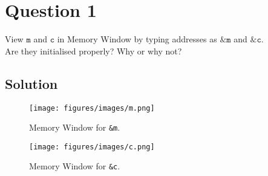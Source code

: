 \section*{Question 1}

View \(\texttt{m}\) and \(\texttt{c}\) in Memory Window by typing addresses as \(\texttt{\&m}\) and \(\texttt{\&c}\).\\
Are they initialised properly?
Why or why not?

\subsection*{Solution}

\begin{figure*}[htbp]
    \centering
    \texttt{[image: figures/images/m.png]}
    \caption{
        Memory Window for \texttt{\&m}.
    }\label{fig:m}
\end{figure*}

\begin{figure*}[htbp]
    \centering
    \texttt{[image: figures/images/c.png]}
    \caption{
        Memory Window for \texttt{\&c}.
    }\label{fig:c}
\end{figure*}
